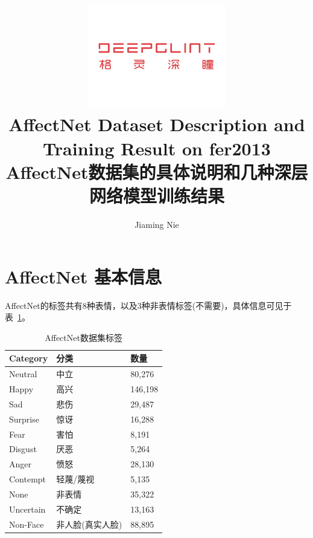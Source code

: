 \documentclass[11pt, a4paper]{article}
\title{\includegraphics[width=0.45\textwidth]{dg}
        \\AffectNet Dataset Description and Training Result on fer2013 \\ AffectNet数据集的具体说明和几种深层网络模型训练结果  }          %
\author{Jiaming Nie}                    %
\begin{document}
\begin{titlepage}
	
\maketitle
{} %




\thispagestyle{empty}  %

\end{titlepage}









\section{AffectNet 基本信息}

AffectNet的标签共有8种表情，以及3种非表情标签(不需要)，具体信息可见于表~\ref{tab:an_label}。
\begin{table}[htbp] 
	\begin{center}
		\caption{AffectNet数据集标签}
		\begin{tabular}{|l|l|l|}  \hline
		Category & 分类 & 数量 \\ \hline
		Neutral & 中立 & 80,276 \\ \hline
		Happy & 高兴 & 146,198 \\ \hline
		Sad & 悲伤 &  29,487 \\ \hline
		Surprise & 惊讶 & 16,288 \\ \hline
		Fear & 害怕 & 8,191 \\ \hline
		Disgust & 厌恶 & 5,264 \\ \hline
		Anger & 愤怒 & 28,130 \\ \hline
		Contempt & 轻蔑/蔑视 & 5,135 \\ \hline
		None &    非表情    & 35,322 \\ \hline
		Uncertain &  不确定 & 13,163 \\ \hline
		Non-Face &  非人脸(真实人脸)  &  88,895 \\ \hline
		\end{tabular}
		
		\label{tab:an_label}
	\end{center}
\end{table}	
\end{document}

